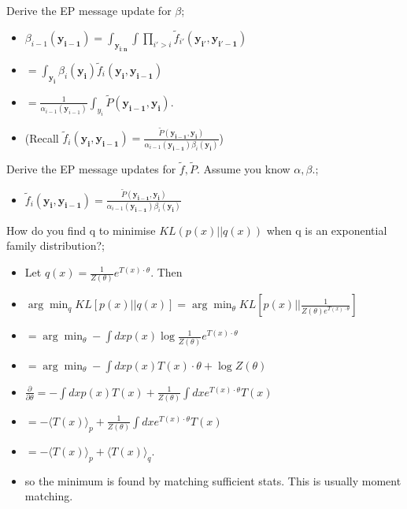 \documentclass{article}
\begin{document}
Derive the EP message update for $\beta$; \begin{itemize} \item $\beta_{i-1}(\mathbf{y_{i-1}}) = \int_{\mathbf{y_{i:n}}} \int \prod_{i'>i} \tilde{f}_{i'}(\mathbf{y_{i'}, \mathbf{y}_{i'-1}})  $ \item $= \int_{\mathbf{y_{i}}}\beta_{i}(\mathbf{y_{i}})\tilde{f}_i(\mathbf{y_i, y_{i-1}})$ \item $= \frac{1}{\alpha_{i-1}(\mathbf{y}_{i-1})}\int_{y_{i}}\tilde{P}(\mathbf{y_{i-1},y_i})$. \item (Recall $\tilde{f}_i(\mathbf{y_i, y_{i-1}}) = \frac{\tilde{P}(\mathbf{y_{i-1}, y_i})}{\alpha_{i-1}(\mathbf{y_{i-1}})\beta_i(\mathbf{y_i})}$) \end{itemize} 

Derive the EP message updates for $\tilde{f}, \tilde{P}$. Assume you know $\alpha, \beta$.; \begin{itemize} \item $\tilde{f}_i(\mathbf{y_i, y_{i-1}}) = \frac{\tilde{P}(\mathbf{y_{i-1}, y_i})}{\alpha_{i-1}(\mathbf{y_{i-1}})\beta_i(\mathbf{y_i})}$ \end{itemize}

How do you find q to minimise $KL(p(x)||q(x))$ when q is an exponential family  distribution?; \begin{itemize} \item Let $q(x) = \frac{1}{Z(\theta)}e^{T(x)\cdot\theta}$. Then \item $\arg\min_q KL[p(x)||q(x)] = \arg\min_{\theta} KL[p(x)||\frac{1}{Z(\theta)e^{T(x)\cdot\theta}}]$ \item $= \arg\min_{\theta} - \int dx p(x) \log \frac{1}{Z(\theta)}e^{T(x)\cdot\theta}$ \item $= \arg\min_{\theta} - \int dx p(x)T(x)\cdot \theta + \log Z(\theta)$ \item $\frac{\partial}{\partial \theta} = - \int dx p(x) T(x) + \frac{1}{Z(\theta)}\int dx e^{T(x)\cdot \theta} T(x)$ \item $= -\langle T(x) \rangle_p + \frac{1}{Z(\theta)}\int dx e^{T(x)\cdot \theta} T(x)$ \item $ = - \langle T(x)\rangle_p + \langle T(x) \rangle_q$. \item so the minimum is found by matching sufficient stats. This is usually moment matching. \end{itemize}
\end{document}
